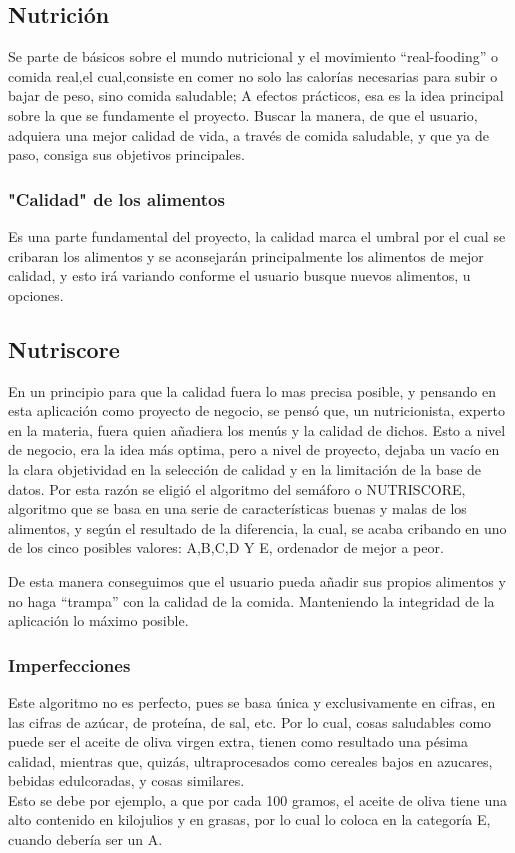 \subsection{Nutrición}
Se parte de  básicos sobre el mundo nutricional y el movimiento “real-fooding”  o comida real,el cual,consiste en comer no solo las calorías necesarias para subir o bajar de peso, sino comida saludable; A efectos prácticos, esa es la idea principal sobre la que se fundamente el proyecto. Buscar la manera, de que el usuario, adquiera una mejor calidad de vida, a través de comida saludable, y que ya de paso, consiga sus objetivos principales.
\subsubsection{"Calidad" de los alimentos}
Es una parte fundamental del proyecto, la calidad marca el umbral por el cual se cribaran los alimentos y se aconsejarán principalmente los alimentos de mejor calidad, y esto irá variando conforme el usuario busque nuevos alimentos, u opciones.
\subsection{Nutriscore}
En un principio para que la calidad fuera lo mas precisa posible, y pensando en esta aplicación como proyecto de negocio, se pensó que, un nutricionista, experto en la materia, fuera quien añadiera los menús y la calidad de dichos. Esto a nivel de negocio, era la idea más optima, pero a nivel de proyecto, dejaba un vacío en la clara objetividad en la selección de calidad y en la limitación de la base de datos. Por esta razón se eligió el algoritmo del semáforo o NUTRISCORE, algoritmo que se basa en una serie de características buenas y malas de los alimentos, y según el resultado de la diferencia, la cual, se acaba cribando en uno de los cinco posibles valores: A,B,C,D Y E, ordenador de mejor a peor.\\


De esta manera conseguimos que el usuario pueda añadir sus propios alimentos y no haga “trampa” con la calidad de la comida. Manteniendo la integridad de la aplicación lo máximo posible.
\subsubsection{Imperfecciones}
Este algoritmo no es perfecto, pues se basa única y exclusivamente en cifras, en las cifras de azúcar, de proteína, de sal, etc. Por lo cual, cosas saludables como puede ser el aceite de oliva virgen extra, tienen como resultado una pésima calidad, mientras que, quizás, ultraprocesados como cereales bajos en azucares, bebidas edulcoradas, y cosas similares. \\
Esto se debe por ejemplo, a que por cada 100 gramos, el aceite de oliva tiene una alto contenido en kilojulios y en grasas, por lo cual lo coloca en la categoría E, cuando debería ser un A.
